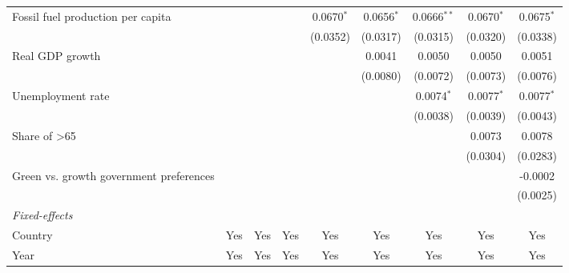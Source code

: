 \begin{table}[htbp]
\begin{tabular}{lcccccccc}
      Fossil fuel production per capita                       &                 &          &          & 0.0670$^{*}$ & 0.0656$^{*}$ & 0.0666$^{**}$ & 0.0670$^{*}$ & 0.0675$^{*}$\\   
                                                              &                 &          &          & (0.0352)     & (0.0317)     & (0.0315)      & (0.0320)     & (0.0338)\\   
      Real GDP growth                                         &                 &          &          &              & 0.0041       & 0.0050        & 0.0050       & 0.0051\\   
                                                              &                 &          &          &              & (0.0080)     & (0.0072)      & (0.0073)     & (0.0076)\\   
      Unemployment rate                                       &                 &          &          &              &              & 0.0074$^{*}$  & 0.0077$^{*}$ & 0.0077$^{*}$\\   
                                                              &                 &          &          &              &              & (0.0038)      & (0.0039)     & (0.0043)\\   
      Share of >65                                            &                 &          &          &              &              &               & 0.0073       & 0.0078\\   
                                                              &                 &          &          &              &              &               & (0.0304)     & (0.0283)\\   
      Green vs. growth government preferences                 &                 &          &          &              &              &               &              & -0.0002\\   
                                                              &                 &          &          &              &              &               &              & (0.0025)\\   
      \midrule
      \emph{Fixed-effects}\\
      Country                                                 & Yes             & Yes      & Yes      & Yes          & Yes          & Yes           & Yes          & Yes\\  
      Year                                                    & Yes             & Yes      & Yes      & Yes          & Yes          & Yes           & Yes          & Yes\\  

\end{tabular}
\end{table}
